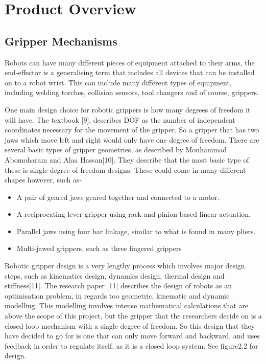 \documentclass{l4proj}
\begin{document}
\section{Product Overview}

\subsection{Gripper Mechanisms}
Robots can have many different pieces of equipment attached to their arms, the end-effector is a generalising term that includes all devices that can be installed on to a robot wrist. This can include many different types of equipment, including welding torches, collision sensors, tool changers and of course, grippers. 

One main design choice for robotic grippers is how many degrees of freedom it will have. The textbook [9], describes DOF as the number of independent coordinates necessary for the movement of the gripper. So a gripper that has two jaws which move left and right would only have one degree of freedom. There are several basic types of gripper geometries, as described by Mouhammad Abomoharam and Alaa Hassan[10]. They describe that the most basic type of these is single degree of freedom designs. These could come in many different shapes however, such as-
\begin{itemize}
	\item
	A pair of geared jaws geared together and connected to a motor.
	\item
	A reciprocating lever gripper using rack and pinion based linear actuation. 
	\item
	Parallel jaws using four bar linkage, similar to what is found in many pliers.
	\item 
	Multi-jawed grippers, such as three fingered grippers 
\end{itemize}

Robotic gripper design is a very lengthy process which involves major design steps, such as kinematics design, dynamics design, thermal design and stiffness[11]. The research paper [11] describes the design of robots as an optimisation problem, in regards too geometric, kinematic and dynamic modelling. This modelling involves intense mathematical calculations that are above the scope of this project, but the gripper that the researchers decide on is a closed loop mechanism with a single degree of freedom. So this design that they have decided to go for is one that can only move forward and backward, and uses feedback in order to regulate itself, as it is a closed loop system. See figure2.2 for design.
\end{document}
